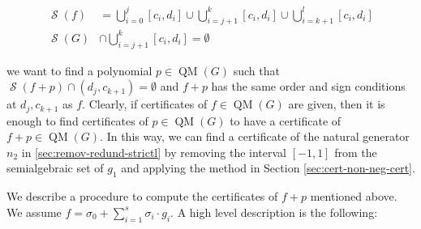 \documentclass[preprint,12pt,authoryear]{elsarticle}
\DeclareMathOperator{\quadmod}{QM}
\DeclareMathOperator{\semialgebraic}{\mathcal{S}}
\begin{document}
\begin{equation} 
  \label{sec:remov-redund-strictl-8}
  \begin{split}
    \semialgebraic(f) &= \bigcup_{i=0}^{j}{[c_i, d_i]} \cup
                        \bigcup_{i=j+1}^{k}{[c_i, d_i]} \cup
                        \bigcup_{i=k+1}^{l}{[c_i, d_i]}\\ 
    \semialgebraic(G) &\cap \bigcup_{i=j+1}^{k}{[c_i, d_i]} = \emptyset
  \end{split}
\end{equation}



we want to find a polynomial $p \in \quadmod(G)$ such that
$\semialgebraic(f + p) \cap (d_j, c_{k+1}) = \emptyset$ and $f + p$ has the same
order and sign conditions at $d_{j}, c_{k+1}$ as $f$. Clearly, if certificates
of $f \in \quadmod(G)$ are given, then it is enough to find certificates of
$p \in \quadmod(G)$ to have a certificate of $f + p \in \quadmod(G)$. In this
way, we can find a certificate of the natural generator $n_2$ in
\th\ref{sec:remov-redund-strictl} by removing the interval $[-1, 1]$ from the
semialgebraic set of $g_1$ and applying the method in Section
\ref{sec:cert-non-neg-cert}.

We describe a procedure to compute the certificates of $f + p$ mentioned above. We
assume $f = \sigma_0 + \sum_{i=1}^{s}{\sigma_i \cdot g_i}$. A high level
description is the following:
\end{document}

